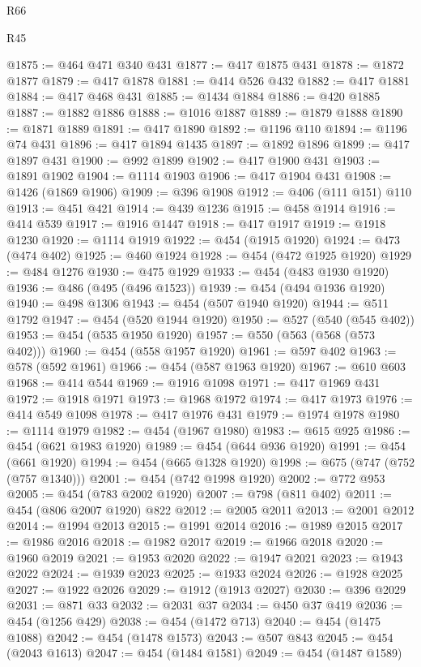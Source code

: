 \begin{lexlean}{R66}
\begin{lexlean}{R45}
\begin{coremodule}
{{{{{{{{{{{{{{{{{{{{{{{{{{{{{{{{{{{{{{{{{{{{{{{{{{{{{{{{{{{{{{{{{{{{{{{{{{{{{{{{{{{{{{{{{{{@1875 := @464 @471 @340 @431
@1877 := @417 @1875 @431
@1878 := @1872 @1877
@1879 := @417 @1878
@1881 := @414 @526 @432
@1882 := @417 @1881
@1884 := @417 @468 @431
@1885 := @1434 @1884
@1886 := @420 @1885
@1887 := @1882 @1886
@1888 := @1016 @1887
@1889 := @1879 @1888
@1890 := @1871 @1889
@1891 := @417 @1890
@1892 := @1196 @110
@1894 := @1196 @74 @431
@1896 := @417 @1894 @1435
@1897 := @1892 @1896
@1899 := @417 @1897 @431
@1900 := @992 @1899
@1902 := @417 @1900 @431
@1903 := @1891 @1902
@1904 := @1114 @1903
@1906 := @417 @1904 @431
@1908 := @1426 (@1869 @1906)
@1909 := @396 @1908
@1912 := @406 (@111 @151) @110
@1913 := @451 @421
@1914 := @439 @1236
@1915 := @458 @1914
@1916 := @414 @539
@1917 := @1916 @1447
@1918 := @417 @1917
@1919 := @1918 @1230
@1920 := @1114 @1919
@1922 := @454 (@1915 @1920)
@1924 := @473 (@474 @402)
@1925 := @460 @1924
@1928 := @454 (@472 @1925 @1920)
@1929 := @484 @1276
@1930 := @475 @1929
@1933 := @454 (@483 @1930 @1920)
@1936 := @486 (@495 (@496 @1523))
@1939 := @454 (@494 @1936 @1920)
@1940 := @498 @1306
@1943 := @454 (@507 @1940 @1920)
@1944 := @511 @1792
@1947 := @454 (@520 @1944 @1920)
@1950 := @527 (@540 (@545 @402))
@1953 := @454 (@535 @1950 @1920)
@1957 := @550 (@563 (@568 (@573 @402)))
@1960 := @454 (@558 @1957 @1920)
@1961 := @597 @402
@1963 := @578 (@592 @1961)
@1966 := @454 (@587 @1963 @1920)
@1967 := @610 @603
@1968 := @414 @544
@1969 := @1916 @1098
@1971 := @417 @1969 @431
@1972 := @1918 @1971
@1973 := @1968 @1972
@1974 := @417 @1973
@1976 := @414 @549 @1098
@1978 := @417 @1976 @431
@1979 := @1974 @1978
@1980 := @1114 @1979
@1982 := @454 (@1967 @1980)
@1983 := @615 @925
@1986 := @454 (@621 @1983 @1920)
@1989 := @454 (@644 @936 @1920)
@1991 := @454 (@661 @1920)
@1994 := @454 (@665 @1328 @1920)
@1998 := @675 (@747 (@752 (@757 @1340)))
@2001 := @454 (@742 @1998 @1920)
@2002 := @772 @953
@2005 := @454 (@783 @2002 @1920)
@2007 := @798 (@811 @402)
@2011 := @454 (@806 @2007 @1920) @822
@2012 := @2005 @2011
@2013 := @2001 @2012
@2014 := @1994 @2013
@2015 := @1991 @2014
@2016 := @1989 @2015
@2017 := @1986 @2016
@2018 := @1982 @2017
@2019 := @1966 @2018
@2020 := @1960 @2019
@2021 := @1953 @2020
@2022 := @1947 @2021
@2023 := @1943 @2022
@2024 := @1939 @2023
@2025 := @1933 @2024
@2026 := @1928 @2025
@2027 := @1922 @2026
@2029 := @1912 (@1913 @2027)
@2030 := @396 @2029
@2031 := @871 @33
@2032 := @2031 @37
@2034 := @450 @37 @419
@2036 := @454 (@1256 @429)
@2038 := @454 (@1472 @713)
@2040 := @454 (@1475 @1088)
@2042 := @454 (@1478 @1573)
@2043 := @507 @843
@2045 := @454 (@2043 @1613)
@2047 := @454 (@1484 @1581)
@2049 := @454 (@1487 @1589)
}}}}}}}}}}}}}}}}}}}}}}}}}}}}}}}}}}}}}}}}}}}}}}}}}}}}}}}}}}}}}}}}}}}}}}}}}}}}}}}}}}}}}}}}}}}
\end{coremodule}
\end{lexlean}
\end{lexlean}
